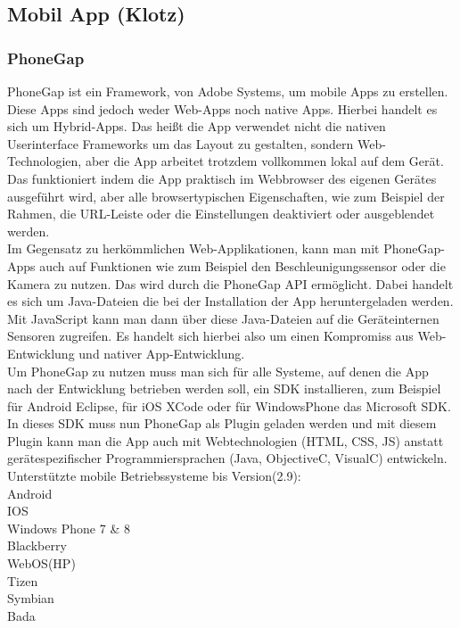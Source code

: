\subsection{Mobil App (Klotz)}

\subsubsection{PhoneGap}
PhoneGap ist ein Framework, von Adobe Systems, um mobile Apps zu erstellen. Diese Apps sind jedoch weder Web-Apps noch native Apps. Hierbei handelt es sich um Hybrid-Apps. Das heißt die App verwendet nicht die nativen Userinterface Frameworks um das Layout zu gestalten, sondern Web-Technologien, aber die App arbeitet trotzdem vollkommen lokal auf dem Gerät.\\
Das funktioniert indem die App praktisch im Webbrowser des eigenen Gerätes ausgeführt wird, aber alle browsertypischen Eigenschaften, wie zum Beispiel der Rahmen, die URL-Leiste oder die Einstellungen deaktiviert oder ausgeblendet werden.\\
Im Gegensatz zu herkömmlichen Web-Applikationen, kann man mit PhoneGap-Apps auch auf Funktionen wie zum Beispiel den Beschleunigungssensor oder die Kamera zu nutzen. Das wird durch die PhoneGap API ermöglicht. Dabei handelt es sich um Java-Dateien die bei der Installation der App heruntergeladen werden. Mit JavaScript kann man dann über diese Java-Dateien auf die Geräteinternen Sensoren zugreifen. Es handelt sich hierbei also um einen Kompromiss aus Web-Entwicklung und nativer App-Entwicklung.\\
Um PhoneGap zu nutzen muss man sich für alle Systeme, auf denen die App nach der Entwicklung betrieben werden soll, ein SDK installieren, zum Beispiel für Android Eclipse, für iOS XCode oder für WindowsPhone das Microsoft SDK. In dieses SDK muss nun PhoneGap als Plugin geladen werden und mit diesem Plugin kann man die App auch mit Webtechnologien (HTML, CSS, JS) anstatt gerätespezifischer Programmiersprachen (Java, ObjectiveC, VisualC) entwickeln.\\
Unterstützte mobile Betriebssysteme bis Version(2.9):\\

					
					Android\\
					IOS\\
					Windows Phone 7 \& 8\\
					Blackberry\\
					WebOS(HP)\\
					Tizen\\
					Symbian\\
					Bada\\


